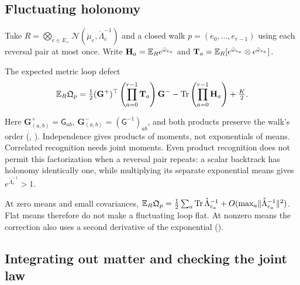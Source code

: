 \subsection{Fluctuating holonomy}

Take \(R=\bigotimes_{e\in E_+}\mathcal N(\mathring\mu_e,\mathring\Lambda_e^{-1})\) and a closed
walk \(p=(e_0,\ldots,e_{r-1})\) using each reversal pair at most once. Write
\(\mathbf H_a=\mathbb E_R e^{\mathring\omega_{e_a}}\) and
\(\mathbf T_a=\mathbb E_R[e^{\mathring\omega_{e_a}}\otimes e^{\mathring\omega_{e_a}}]\).
\begin{keyequation}{The expected metric loop defect}
\[
\mathbb E_R\mathfrak Q_p
=\tfrac12(\mathbf G^+)^\top\left(\prod_{a=0}^{r-1}\mathbf T_a\right)\mathbf G^-
-\operatorname{Tr}\left(\prod_{a=0}^{r-1}\mathbf H_a\right)+\tfrac K2.
\]
\end{keyequation}
Here \(\mathbf G^+_{(a,b)}=\mathsf G_{ab}\),
\(\mathbf G^-_{(a,b)}=(\mathsf G^{-1})_{ab}\), and both products preserve the walk's order
(, ). Independence gives products of
moments, not exponentials of means. Correlated recognition needs joint moments. Even product
recognition does not permit this factorization when a reversal pair repeats: a scalar backtrack
has holonomy identically one, while multiplying its separate exponential means gives
\(e^{\mathring\Lambda_e^{-1}}>1\).

At zero means and small covariances,
\(\mathbb E_R\mathfrak Q_p=\tfrac12\sum_a\operatorname{Tr}\mathring\Lambda_{e_a}^{-1}
+O(\max_a\lVert\mathring\Lambda_{e_a}^{-1}\rVert^2)\).
Flat means therefore do not make a fluctuating loop flat. At nonzero means the correction also
uses a second derivative of the exponential ().

\subsection{Integrating out matter and checking the joint law}

